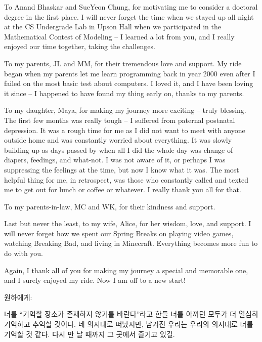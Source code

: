 To Anand Bhaskar and SueYeon Chung, for motivating me to consider a doctoral degree in the first place. I will never forget the time when we stayed up all night at the CS Undergrade Lab in Upson Hall when we participated in the Mathematical Contest of Modeling -- I learned a lot from you, and I really enjoyed our time together, taking the challenges.

To my parents, JL and MM, for their tremendous love and support. My ride began when my parents let me learn programming back in year 2000 even after I failed on the most basic test about computers. I loved it, and I have been loving it since -- I happened to have found my thing early on, thanks to my parents. 

To my daughter, Maya, for making my journey more exciting -- truly blessing. The first few months was really tough -- I suffered from paternal postnatal depression. It was a rough time for me as I did not want to meet with anyone outside home and was constantly worried about everything. It was slowly building up as days passed by when all I did the whole day was change of diapers, feedings, and what-not. I was not aware of it, or perhaps I was suppressing the feelings at the time, but now I know what it was. The most helpful thing for me, in retrospect, was those who constantly called and texted me to get out for lunch or coffee or whatever. I really thank you all for that.

To my parents-in-law, MC and WK, for their kindness and support.

Last but never the least, to my wife, Alice, for her wisdom, love, and support. I will never forget how we spent our Spring Breaks on playing video games, watching Breaking Bad, and living in Minecraft. Everything becomes more fun to do with you.

Again, I thank all of you for making my journey a special and memorable one, and I surely enjoyed my ride. Now I am off to a new start!


\vspace{4 em}

원하에게: 

너를 ``기억할 장소가 존재하지 않기를 바란다''라고 한들 너를 아끼던 모두가 더 열심히 기억하고 추억할 것이다. 네 의지대로 떠났지만, 남겨진 우리는 우리의 의지대로 너를 기억할 것 같다. 다시 만 날 때까지 그 곳에서 즐기고 있길.
